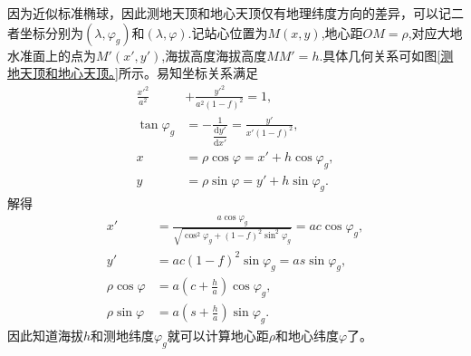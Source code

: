 \documentclass[11pt, a4paper, oneside]{ctexart}
\numberwithin{equation}{subsection}
\begin{document}
因为近似标准椭球，因此测地天顶和地心天顶仅有地理纬度方向的差异，可以记二者坐标分别为$\left(\lambda,\varphi_{g}\right)$和$\left(\lambda,\varphi\right)$.记站心位置为$M\left(x,y\right)$,地心距$OM=\rho$,对应大地水准面上的点为$M'\left(x',y'\right)$,海拔高度海拔高度$MM'=h$.具体几何关系可如图\ref{测地天顶和地心天顶。}所示。易知坐标关系满足
\begin{align}
\frac{x'^2}{a^2}&+\frac{y'^2}{a^2\left(1-f\right)^2}=1,\\
\tan\varphi_g&=-\frac{1}{\dfrac{\mathrm{d}y'}{\mathrm{d}x'}}=\frac{y'}{x'\left(1-f\right)^2},\\
x&=\rho\cos\varphi=x'+h\cos\varphi_g,\\
y&=\rho\sin\varphi=y'+h\sin\varphi_g.
\end{align}
解得
\begin{align}
x'&=\frac{a\cos\varphi_g}{\sqrt{\cos^2\varphi_g+\left(1-f\right)^2\sin^2\varphi_g}}=ac\cos\varphi_g,\\
y'&=ac\left(1-f\right)^2\sin\varphi_g=as\sin\varphi_g,\\
\rho\cos\varphi&=a\left(c+\frac{h}{a}\right)\cos\varphi_g,\\
\rho\sin\varphi&=a\left(s+\frac{h}{a}\right)\sin\varphi_g.
\end{align}
因此知道海拔$h$和测地纬度$\varphi_{g}$就可以计算地心距$\rho$和地心纬度$\varphi$了。
\end{document}
